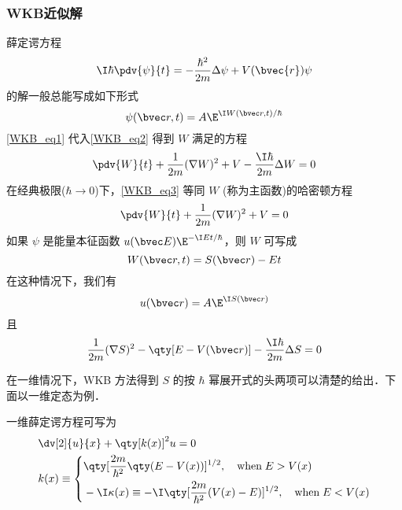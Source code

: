 \subsubsection{WKB近似解}
薛定谔方程
\begin{equation}\label{WKB_eq2}
\I\hbar\pdv{\psi}{t}=-\frac{\hbar^2}{2m}\Delta\psi+V(\bvec{r})\psi
\end{equation}
的解一般总能写成如下形式
\begin{equation}\label{WKB_eq1}
\psi(\bvec r,t)=A\E^{\I W(\bvec r,t)/\hbar}
\end{equation}
\autoref{WKB_eq1} 代入\autoref{WKB_eq2} 得到 $W$ 满足的方程
\begin{equation}\label{WKB_eq3}
\pdv{W}{t}+\frac{1}{2m}(\nabla W)^2+V-\frac{\I\hbar}{2m}\Delta W=0
\end{equation}
在经典极限($\hbar\rightarrow 0$)下，\autoref{WKB_eq3} 等同 $W$ (称为主函数)的哈密顿方程
\begin{equation}
\pdv{W}{t}+\frac{1}{2m}(\nabla W)^2+V=0
\end{equation}
如果 $\psi$ 是能量本征函数 $u(\bvec E)\E^{-\I Et/\hbar}$，则 $W$ 可写成
\begin{equation}
W(\bvec r,t)=S(\bvec r)-Et
\end{equation}
在这种情况下，我们有
\begin{equation}
u(\bvec r)=A\E^{\I S(\bvec r)}
\end{equation}
且
\begin{equation}
\frac{1}{2m}(\nabla S)^2-\qty[E-V(\bvec r)]-\frac{\I\hbar}{2m}\Delta S=0
\end{equation}

在一维情况下，WKB 方法得到 $S$ 的按 $\hbar$ 幂展开式的头两项可以清楚的给出．下面以一维定态为例．

一维薛定谔方程可写为
\begin{equation}\label{WKB_eq4}
\begin{aligned}
&\dv[2]{u}{x}+\qty[k(x)]^2u=0\\
&k(x)\equiv\left\{\begin{aligned}
&\qty[\frac{2m}{\hbar^2}\qty(E-V(x))]^{1/2},\quad \text{when}\; E>V(x)\\
&-\I\kappa(x)\equiv-\I\qty[\frac{2m}{\hbar^2}(V(x)-E)]^{1/2},\quad \text{when}\; E<V(x)
\end{aligned}\right.
\end{aligned}
\end{equation}

